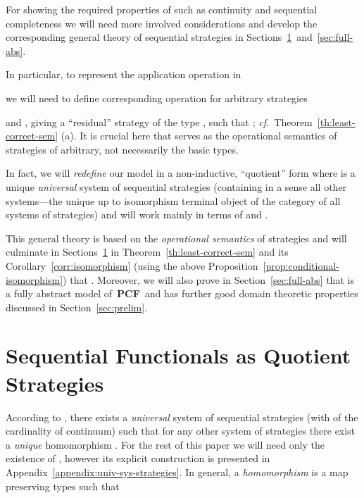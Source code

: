 \documentclass[fleqn]{LMCS}
\theoremstyle{plain}\newtheorem{satz}[thm]{Satz}
\theoremstyle{plain}\newtheorem{hyp}[thm]{Hypothesis}
\theoremstyle{plain}\newtheorem{hyps}[thm]{Hypotheses}
\theoremstyle{definition}\newtheorem{note}[thm]{Note}
\def\cf{{\em cf.}}
\newcommand{\PCF}{\mbox{\bf PCF}}
\newcommand{\?}{\mbox{?}}
\begin{document}
\noindent
For showing the required properties of  such as continuity 
and sequential completeness 
we will need more involved considerations and  
develop the corresponding general theory of sequential strategies 
\cite{Saz76SMZH,Saz76AL}
in Sections~\ref{sec-quotient}~and~\ref{sec:full-abs}. 

In particular, to represent the application operation in 

we will need to define corresponding operation
 for arbitrary strategies

and \mbox{}, giving a ``residual'' strategy 
 of the type
, such that
; 
\cf\ Theorem~\ref{th:least-correct-sem} (a).
It is crucial here that  serves as the operational semantics of strategies of arbitrary, not necessarily the basic types. 


In fact, we will \emph{redefine} our model in a non-inductive, ``quotient'' form 
 where  
is a unique \emph{universal} system of sequential strategies 
(containing in a sense all other systems---the unique up to isomorphism 
terminal object of the category 
of all systems of strategies) and will work mainly in terms of  and . 




This general theory is based on the 
\emph{operational semantics} of strategies and will culminate in 
Sections~\ref{sec-quotient} in 
Theorem~\ref{th:least-correct-sem} and its Corollary~\ref{corr:isomorphism} 
(using the above Proposition~\ref{prop:conditional-isomorphism}) that . 
Moreover, 
we will also prove in Section~\ref{sec:full-abs} that  is a fully
abstract 
model of~\PCF\ and has further good domain theoretic properties discussed in
Section~\ref{sec:prelim}.  

















\section{Sequential Functionals as Quotient Strategies}
\label{sec-quotient}

\noindent
According to \cite{Saz76SMZH,Saz76t}, 
there exists a {\em universal\/} system of
sequential strategies  
(with  of the cardinality of continuum)
such that for any other system
of strategies  there exist a \emph{unique} homomorphism
. 
For the rest of this paper we will need only the existence of , 
however its explicit construction is presented 
in Appendix~\ref{appendix:univ-sys-strategies}. 
In general, 
a \emph{homomorphism} 
is a map  preserving types such that 
\end{document}
